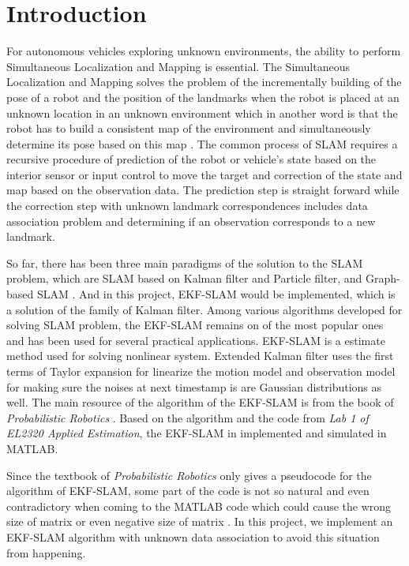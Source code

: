 \documentclass[conference]{IEEEtran}
\begin{document}
\section{Introduction}
\par For autonomous vehicles exploring unknown environments, the ability to perform Simultaneous Localization and Mapping is essential. The Simultaneous Localization and Mapping solves the problem of the incrementally building of the pose of a robot and the position of the landmarks when the robot is placed at an unknown location in an unknown environment which in another word is that the robot has to build a consistent map of the environment and simultaneously determine its pose based on this map \cite{EKF-SLAM-01}. The common process of SLAM requires a recursive procedure of prediction of the robot or vehicle's state based on the interior sensor or input control to move the target and correction of the state and map based on the observation data. The prediction step is straight forward while the correction step with unknown landmark correspondences includes data association problem and determining if an observation corresponds to a new landmark.
\par So far, there has been three main paradigms of the solution to the SLAM problem, which are SLAM based on Kalman filter and Particle filter, and Graph-based SLAM \cite{SLAM-01}. And in this project, EKF-SLAM would be implemented, which is a solution of the family of Kalman filter. Among various algorithms developed for solving SLAM problem, the EKF-SLAM remains on of the most popular ones and has been used for several practical applications. EKF-SLAM is a estimate method used for solving nonlinear system. Extended Kalman filter uses the first terms of Taylor expansion for linearize the motion model and observation model for making sure the noises at next timestamp is are Gaussian distributions as well. The main resource of the algorithm of the EKF-SLAM is from the book of \textit{Probabilistic Robotics} \cite{Probabilistic_Robotics}. Based on the algorithm and the code from \textit{Lab 1 of EL2320 Applied Estimation}, the EKF-SLAM in implemented and simulated in MATLAB.
\par Since the textbook of \textit{Probabilistic Robotics} only gives a pseudocode for the algorithm of EKF-SLAM, some part of the code is not so natural and even contradictory when coming to the MATLAB code which could cause the wrong size of matrix or even negative size of matrix \cite{Probabilistic_Robotics}. In this project, we implement an EKF-SLAM algorithm with unknown data association to avoid this situation from happening.
\end{document}

